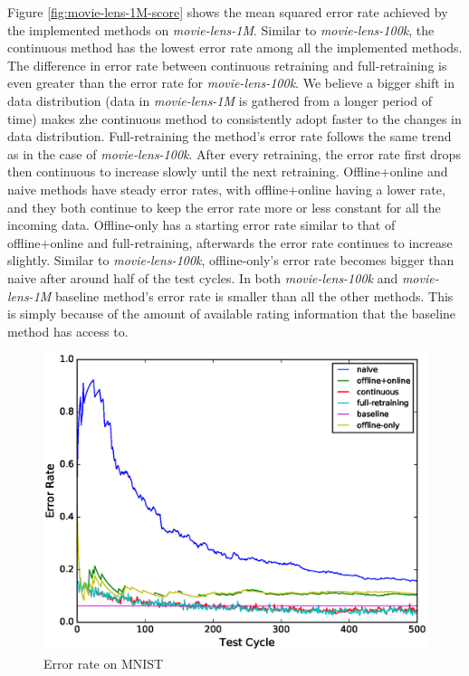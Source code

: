 \documentclass{vldb}
\begin{document}
Figure \ref{fig:movie-lens-1M-score} shows the mean squared error rate achieved by the implemented methods on \textit{movie-lens-1M}.
Similar to \textit{movie-lens-100k}, the continuous method has the lowest error rate among all the implemented methods.
The difference in error rate between continuous retraining and full-retraining is even greater than the error rate for \textit{movie-lens-100k}.
We believe a bigger shift in data distribution (data in \textit{movie-lens-1M} is gathered from a longer period of time) makes zhe continuous method to consistently 
adopt faster to the changes in data distribution.
Full-retraining the method's error rate follows the same trend as in the case of \textit{movie-lens-100k}. 
After every retraining, the error rate first drops then continuous to increase slowly until the next retraining.
Offline+online and naive methods have steady error rates, with offline+online having a lower rate, and they both continue to keep the error rate more or less constant for all the incoming data.
Offline-only has a starting error rate similar to that of offline+online and full-retraining, afterwards the error rate continues to increase slightly.
Similar to \textit{movie-lens-100k}, offline-only's error rate becomes bigger than naive after around half of the test cycles.
In both \textit{movie-lens-100k} and \textit{movie-lens-1M} baseline method's error rate is smaller than all the other methods.
This is simply because of the amount of available rating information that the baseline method has access to.

\begin{figure}[h]
 \centering
 \includegraphics[width=\columnwidth]{../images/experiment-results/mnist-quality.eps}
 \caption{Error rate on MNIST}
 \label{fig:mnist-quality}
 \end{figure}
 
\end{document}
